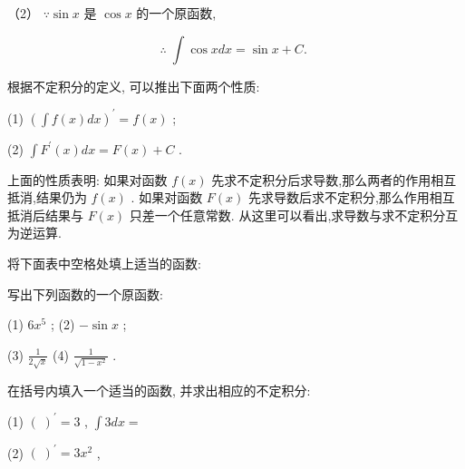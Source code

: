 \documentclass[lang=cn,newtx,10pt,scheme=chinese]{elegantbook}
\begin{document}
（2） \(\because \sin x\) 是 \(\cos x\) 的一个原函数,

\[
\therefore \;\int \cos {xdx} = \sin x + C\text{. }
\]

根据不定积分的定义, 可以推出下面两个性质:

(1) \({\left( \int f\left( x\right) dx\right) }^{\prime } = f\left( x\right)\) ;

(2) \(\int {F}^{\prime }\left( x\right) {dx} = F\left( x\right) + C\) .

上面的性质表明: 如果对函数 \(f\left( x\right)\) 先求不定积分后求导数,那么两者的作用相互抵消,结果仍为 \(f\left( x\right)\) . 如果对函数 \(F\left( x\right)\) 先求导数后求不定积分,那么作用相互抵消后结果与 \(F\left( x\right)\) 只差一个任意常数. 从这里可以看出,求导数与求不定积分互为逆运算.

\begin{problemset}[练习]

\item 将下面表中空格处填上适当的函数:

\begin{center}
\end{center}

\item 写出下列函数的一个原函数:

(1) \(6{x}^{5}\) ; (2) \(- \sin x\) ;

(3) \(\frac{1}{2\sqrt{x}}\) (4) \(\frac{1}{\sqrt{1 - {x}^{2}}}\) .

\item 在括号内填入一个适当的函数, 并求出相应的不定积分:

(1) \({\left( \;\right) }^{\prime } = 3\) , \(\int {3dx} =\)

(2) \({\left( \;\right) }^{\prime } = 3{x}^{2}\) ,


\end{problemset}
\end{document}
